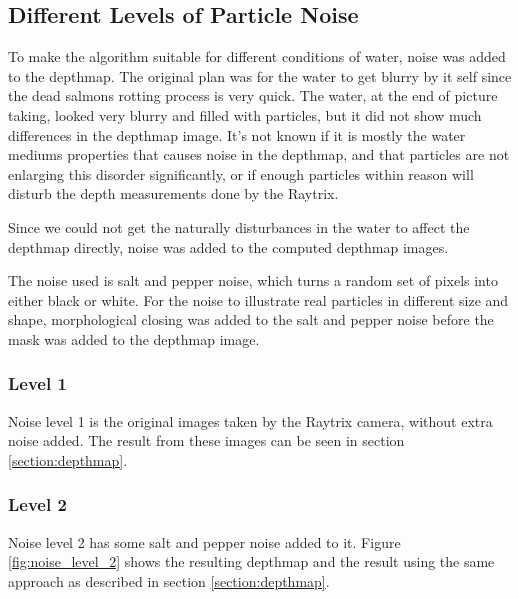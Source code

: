 \subsection{Different Levels of Particle Noise}

To make the algorithm suitable for different conditions of water, noise was added to the depthmap.
The original plan was for the water to get blurry by it self since the dead salmons rotting process is very quick. The water, at the end of picture taking, looked very blurry and filled with particles, but it did not show much differences in the depthmap image. It's not known if it is mostly the water mediums properties that causes noise in the depthmap, and that particles are not enlarging this disorder significantly, or if enough particles within reason will disturb the depth measurements done by the Raytrix.

Since we could not get the naturally disturbances in the water to affect the depthmap directly, noise was added to the computed depthmap images.

The noise used is salt and pepper noise, which turns a random set of pixels into either black or white. For the noise to illustrate real particles in different size and shape, morphological closing was added to the salt and pepper noise before the mask was added to the depthmap image.


\subsubsection{Level 1}

Noise level 1 is the original images taken by the Raytrix camera, without extra noise added.
The result from these images can be seen in section \ref{section:depthmap}.


\subsubsection{Level 2}

Noise level 2 has some salt and pepper noise added to it. Figure \ref{fig:noise_level_2} shows the resulting depthmap and the result using the same approach as described in section \ref{section:depthmap}.

